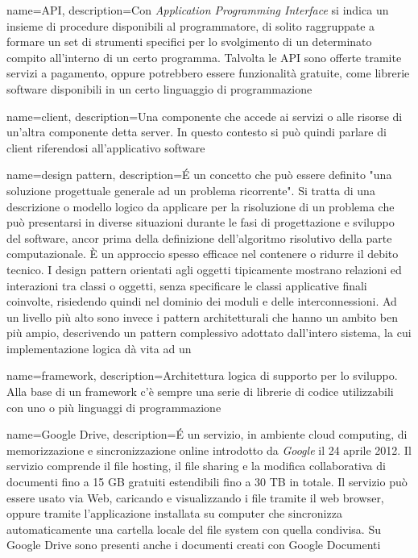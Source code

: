 {
	name=API,
	description={Con \emph{Application Programming Interface} si indica un insieme di procedure disponibili al programmatore, di solito raggruppate a formare un set di strumenti specifici per lo svolgimento di un determinato compito all’interno di un certo programma. Talvolta le API sono offerte tramite servizi a pagamento, oppure potrebbero essere funzionalità gratuite, come librerie software disponibili in un certo linguaggio di programmazione}
}

{
	name=client,
	description={Una componente che accede ai servizi o alle risorse di un'altra componente detta server. In questo contesto si può quindi parlare di client riferendosi all'applicativo software}
}

{
	name=design pattern,
	description={\'E un concetto che può essere definito "una soluzione progettuale generale ad un problema ricorrente". Si tratta di una descrizione o modello logico da applicare per la risoluzione di un problema che può presentarsi in diverse situazioni durante le fasi di progettazione e sviluppo del software, ancor prima della definizione dell'algoritmo risolutivo della parte computazionale. È un approccio spesso efficace nel contenere o ridurre il debito tecnico.
I design pattern orientati agli oggetti tipicamente mostrano relazioni ed interazioni tra classi o oggetti, senza specificare le classi applicative finali coinvolte, risiedendo quindi nel dominio dei moduli e delle interconnessioni. Ad un livello più alto sono invece i pattern architetturali che hanno un ambito ben più ampio, descrivendo un pattern complessivo adottato dall'intero sistema, la cui implementazione logica dà vita ad un }
}

{
	name=framework,
	description={Architettura logica di supporto per lo sviluppo. Alla base di un framework c’è sempre una serie di librerie di codice utilizzabili con uno o più linguaggi di programmazione}
}

{
	name=Google Drive,
	description={\'E un servizio, in ambiente cloud computing, di memorizzazione e sincronizzazione online introdotto da \emph{Google} il 24 aprile 2012. Il servizio comprende il file hosting, il file sharing e la modifica collaborativa di documenti fino a 15 GB gratuiti estendibili fino a 30 TB in totale. Il servizio può essere usato via Web, caricando e visualizzando i file tramite il web browser, oppure tramite l'applicazione installata su computer che sincronizza automaticamente una cartella locale del file system con quella condivisa. Su Google Drive sono presenti anche i documenti creati con Google Documenti}
}

